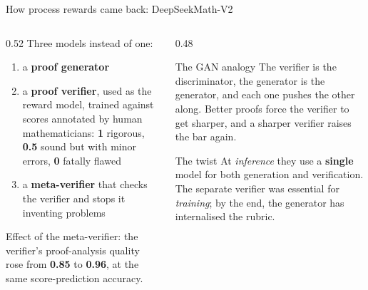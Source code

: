 \documentclass[aspectratio=169,10pt]{beamer}
\begin{document}
\begin{frame}{How process rewards came back: DeepSeekMath-V2}
  \begin{columns}[T]
    \begin{column}{0.52\textwidth}
      Three models instead of one:
      \begin{enumerate}
        \item a \textbf{proof generator}
        \item a \textbf{proof verifier}, used as the reward model, trained
          against scores annotated by human mathematicians:
          \textbf{1} rigorous, \textbf{0.5} sound but with minor errors,
          \textbf{0} fatally flawed
        \item a \textbf{meta-verifier} that checks the verifier and stops it
          inventing problems
      \end{enumerate}
      \vspace{0.4em}
      Effect of the meta-verifier: the verifier's proof-analysis quality rose
      from \textbf{0.85} to \textbf{0.96}, at the same score-prediction
      accuracy.
    \end{column}
    \begin{column}{0.48\textwidth}
      \begin{block}{The GAN analogy}
        \small
        The verifier is the discriminator, the generator is the generator, and
        each one pushes the other along. Better proofs force the verifier to
        get sharper, and a sharper verifier raises the bar again.
      \end{block}
      \vspace{0.3em}
      \begin{block}{The twist}
        \small
        At \emph{inference} they use a \textbf{single} model for both
        generation and verification. The separate verifier was essential for
        \emph{training}; by the end, the generator has internalised the rubric.
      \end{block}
    \end{column}
  \end{columns}
\end{frame}
\end{document}
